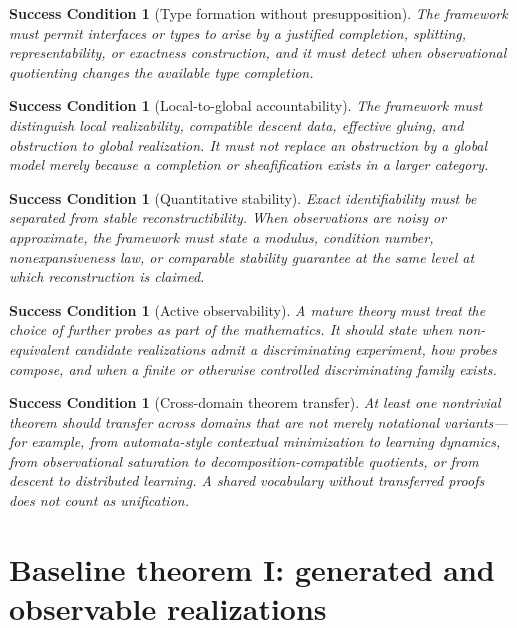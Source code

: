 \documentclass[11pt]{article}
\newtheorem{condition}[theorem]{Success Condition}
\theoremstyle{definition}
\theoremstyle{remark}
\begin{document}
\begin{condition}[Type formation without presupposition]
The framework must permit interfaces or types to arise by a justified completion, splitting, representability, or exactness construction, and it must detect when observational quotienting changes the available type completion.
\end{condition}

\begin{condition}[Local-to-global accountability]
The framework must distinguish local realizability, compatible descent data, effective gluing, and obstruction to global realization. It must not replace an obstruction by a global model merely because a completion or sheafification exists in a larger category.
\end{condition}

\begin{condition}[Quantitative stability]
Exact identifiability must be separated from stable reconstructibility. When observations are noisy or approximate, the framework must state a modulus, condition number, nonexpansiveness law, or comparable stability guarantee at the same level at which reconstruction is claimed.
\end{condition}

\begin{condition}[Active observability]
A mature theory must treat the choice of further probes as part of the mathematics. It should state when non-equivalent candidate realizations admit a discriminating experiment, how probes compose, and when a finite or otherwise controlled discriminating family exists.
\end{condition}

\begin{condition}[Cross-domain theorem transfer]
At least one nontrivial theorem should transfer across domains that are not merely notational variants---for example, from automata-style contextual minimization to learning dynamics, from observational saturation to decomposition-compatible quotients, or from descent to distributed learning. A shared vocabulary without transferred proofs does not count as unification.
\end{condition}

\section{Baseline theorem I: generated and observable realizations}
\end{document}

